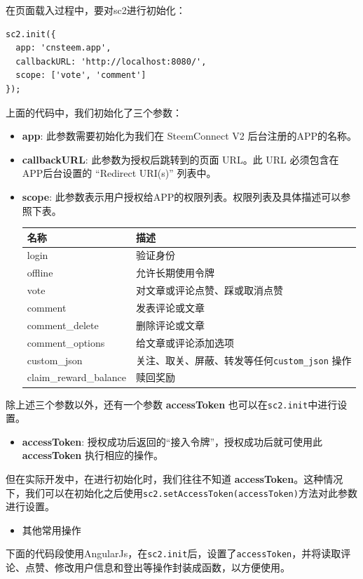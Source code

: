 \documentclass[]{ctexbook}
\providecommand{\tightlist}{%
  \setlength{\itemsep}{0pt}\setlength{\parskip}{0pt}}
\begin{document}
在页面载入过程中，要对sc2进行初始化：

\begin{verbatim}
sc2.init({
  app: 'cnsteem.app',
  callbackURL: 'http://localhost:8080/',
  scope: ['vote', 'comment']
});
\end{verbatim}

上面的代码中，我们初始化了三个参数：

\begin{itemize}
\item
  \textbf{app}: 此参数需要初始化为我们在 SteemConnect V2 后台注册的APP的名称。
\item
  \textbf{callbackURL}: 此参数为授权后跳转到的页面 URL。此 URL 必须包含在APP后台设置的 ``Redirect URI(s)'' 列表中。
\item
  \textbf{scope}: 此参数表示用户授权给APP的权限列表。权限列表及具体描述可以参照下表。

  \begin{longtable}[]{@{}ll@{}}
  \toprule
  名称 & 描述\tabularnewline
  \midrule
  \endhead
  login & 验证身份\tabularnewline
  offline & 允许长期使用令牌\tabularnewline
  vote & 对文章或评论点赞、踩或取消点赞\tabularnewline
  comment & 发表评论或文章\tabularnewline
  comment\_delete & 删除评论或文章\tabularnewline
  comment\_options & 给文章或评论添加选项\tabularnewline
  custom\_json & 关注、取关、屏蔽、转发等任何\texttt{custom\_json} 操作\tabularnewline
  claim\_reward\_balance & 赎回奖励\tabularnewline
  \bottomrule
  \end{longtable}
\end{itemize}

除上述三个参数以外，还有一个参数 \textbf{accessToken} 也可以在\texttt{sc2.init}中进行设置。

\begin{itemize}
\tightlist
\item
  \textbf{accessToken}: 授权成功后返回的``接入令牌''，授权成功后就可使用此\textbf{accessToken} 执行相应的操作。
\end{itemize}

但在实际开发中，在进行初始化时，我们往往不知道 \textbf{accessToken}。这种情况下，我们可以在初始化之后使用\texttt{sc2.setAccessToken(accessToken)}方法对此参数进行设置。

\begin{itemize}
\tightlist
\item
  其他常用操作
\end{itemize}

下面的代码段使用AngularJs，在\texttt{sc2.init}后，设置了\texttt{accessToken}，并将读取评论、点赞、修改用户信息和登出等操作封装成函数，以方便使用。
\end{document}

